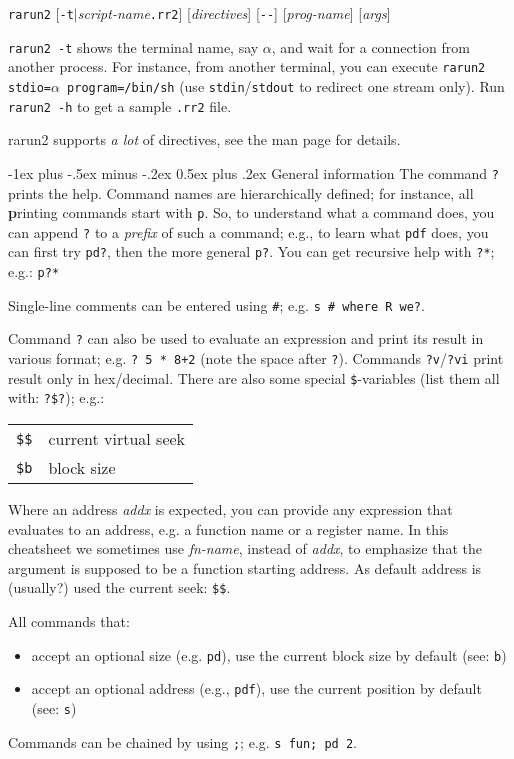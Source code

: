 \documentclass[a4paper,landscape]{article}
\makeatletter
\renewcommand{\section}{\@startsection{section}{1}{0mm}%
                                {-1ex plus -.5ex minus -.2ex}%
                                {0.5ex plus .2ex}%
                                {\normalfont\large\bfseries}}
\makeatother
\begin{document}
\begin{multicols*}{3}
\texttt{rarun2} [\texttt{-t}$|$\textit{script-name}\texttt{.rr2}] [\textit{directives}] [\texttt{-{}-}] [\textit{prog-name}] [\textit{args}]

\texttt{rarun2 -t} shows the terminal name, say $\alpha$, and wait for a connection from another process. For instance, from another terminal, you can execute \texttt{rarun2 stdio=$\alpha$ program=/bin/sh} (use \texttt{stdin}/\texttt{stdout} to redirect one stream only). Run \texttt{rarun2 -h} to get a sample \texttt{.rr2} file.

rarun2 supports \emph{a lot} of directives, see the man page for details.

\section{General information}
The command \texttt{?} prints the help. Command names are hierarchically defined; for instance, all \textbf{p}rinting commands start with \texttt{p}. So, to understand what a command does, you can append \texttt{?} to a \emph{prefix} of such a command; e.g., to learn what \texttt{pdf} does, you can first try \texttt{pd?}, then the more general \texttt{p?}.
You can get recursive help with \texttt{?*}; e.g.: \texttt{p?*}

Single-line comments can be entered using \texttt{\#}; e.g. \texttt{s \# where R we?}.

Command \texttt{?} can also be used to evaluate an expression and print its result in various format; e.g. \texttt{? 5 * 8+2} (note the space after \texttt{?}). Commands \texttt{?v}/\texttt{?vi} print result only in hex/decimal. There are also some special \texttt{\$}-variables
(list them all with: \texttt{?\$?}); e.g.:

\begin{tabular}{@{}ll@{}}
\texttt{\$\$} & current virtual seek \\
\texttt{\$b} & 	block size \\
\end{tabular}

Where an address \textit{addx} is expected, you can provide any expression that evaluates to an address,
e.g. a function name or a register name. In this cheatsheet we sometimes use \textit{fn-name}, instead of \textit{addx}, to emphasize that the argument is supposed to be a function starting address. As default address is (usually?) used the current seek: \texttt{\$\$}.

All commands that:
\begin{itemize}
\item accept an optional size (e.g. \texttt{pd}), use the current block size by default (see: \texttt{b})
\item accept an optional address (e.g., \texttt{pdf}), use the current position by default (see: \texttt{s})
\end{itemize}
Commands can be chained by using \texttt{;}; e.g. \texttt{s fun; pd 2}.


\end{multicols*}
\end{document}
